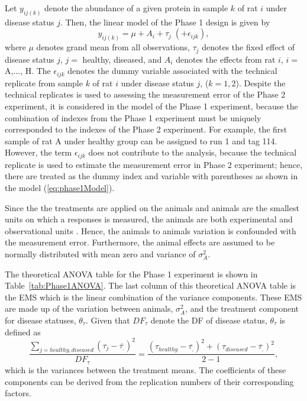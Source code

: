 \documentclass[article]{jss}
\begin{document}
Let $y_{ij(k)}$ denote the abundance of a given protein in sample $k$ of rat $i$ under disease status $j$. Then, the linear model of the Phase 1 design is given by
\begin{equation}\label{eq:phase1Model}
y_{ij(k)}= \mu + A_{i} + \tau_{j} \; (+ \epsilon_{ijk} ),
\end{equation}
where $\mu$ denotes grand mean from all observations, $\tau_{j}$ denotes the fixed effect of disease status $j$, $j=$ healthy, diseased, and $A_{i}$ denotes the effects from rat $i$, $i=$ A,$\dots$, H. The $\epsilon_{ijk}$ denotes the dummy variable associated with the technical replicate from sample $k$ of rat $i$ under disease status $j$, ($k = 1, 2$). Despite the technical replicates is used to assessing the measurement error of the Phase 2 experiment, it is considered in the model of the Phase 1 experiment, because the combination of indexes from the Phase 1 experiment must be uniquely corresponded to the indexes of the Phase 2 experiment. For example, the first sample of rat A under healthy group can be assigned to run 1 and tag 114. However, the term $\epsilon_{ijk}$ does not contribute to the analysis, because the technical replicate is used to estimate the measurement error in Phase 2 experiment; hence, there are treated as the dummy index and variable with parentheses as shown in the model (\ref{eq:phase1Model}). 

Since the the treatments are applied on the animals and animals are the smallest units on which a responses is measured, the animals are both experimental and observational units \citep{Bailey2008}. Hence, the animals to animals variation is confounded with the measurement error. Furthermore, the animal effects are assumed to be normally distributed with mean zero and variance of $\sigma_{A}^2$.

The theoretical ANOVA table for the Phase 1 experiment is shown in Table~\ref{tab:Phase1ANOVA}. The last column of this theoretical ANOVA table is the EMS which is the linear combination of the variance components. These EMS are made up of the variation between animals, $\sigma_{A}^2$, and the treatment component for disease statuses, $\theta_{\tau}$. Given that $DF_{\tau}$ denote the DF of disease status, $\theta_{\tau}$ is defined as 
\[\frac{\displaystyle \sum_{j = healthy, diseased}(\tau_{j} - \overline{\tau_{.}})^2}{DF_{\tau}}=
\frac{(\tau_{healthy} - \overline{\tau_{.}})^2 + (\tau_{diseased} - \overline{\tau_{.}})^2}{2-1},\] 
which is the variances between the treatment means. The coefficients of these components can be derived from the replication numbers of their corresponding factors. 
\end{document}
